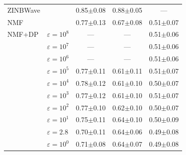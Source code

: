 \begin{tabular}{llccc}
\addlinespace[3pt]
ZINBWave &  & 0.85{\scriptsize$\pm$0.08} & 0.88{\scriptsize$\pm$0.05} & --- \\
\addlinespace[3pt]
NMF &  & 0.77{\scriptsize$\pm$0.13} & 0.67{\scriptsize$\pm$0.08} & 0.51{\scriptsize$\pm$0.07} \\
\addlinespace[3pt]
NMF+DP & $\varepsilon=10^{8}$ & --- & --- & 0.51{\scriptsize$\pm$0.06} \\
 & $\varepsilon=10^{7}$ & --- & --- & 0.51{\scriptsize$\pm$0.06} \\
 & $\varepsilon=10^{6}$ & --- & --- & 0.51{\scriptsize$\pm$0.06} \\
 & $\varepsilon=10^{5}$ & 0.77{\scriptsize$\pm$0.11} & 0.61{\scriptsize$\pm$0.11} & 0.51{\scriptsize$\pm$0.07} \\
 & $\varepsilon=10^{4}$ & 0.78{\scriptsize$\pm$0.12} & 0.61{\scriptsize$\pm$0.10} & 0.50{\scriptsize$\pm$0.07} \\
 & $\varepsilon=10^{3}$ & 0.77{\scriptsize$\pm$0.12} & 0.61{\scriptsize$\pm$0.10} & 0.51{\scriptsize$\pm$0.07} \\
 & $\varepsilon=10^{2}$ & 0.77{\scriptsize$\pm$0.10} & 0.62{\scriptsize$\pm$0.10} & 0.50{\scriptsize$\pm$0.07} \\
 & $\varepsilon=10^{1}$ & 0.75{\scriptsize$\pm$0.11} & 0.64{\scriptsize$\pm$0.10} & 0.50{\scriptsize$\pm$0.09} \\
 & $\varepsilon=2.8$ & 0.70{\scriptsize$\pm$0.11} & 0.64{\scriptsize$\pm$0.06} & 0.49{\scriptsize$\pm$0.08} \\
 & $\varepsilon=10^{0}$ & 0.71{\scriptsize$\pm$0.08} & 0.64{\scriptsize$\pm$0.07} & 0.49{\scriptsize$\pm$0.08} \\
\bottomrule
\end{tabular}

